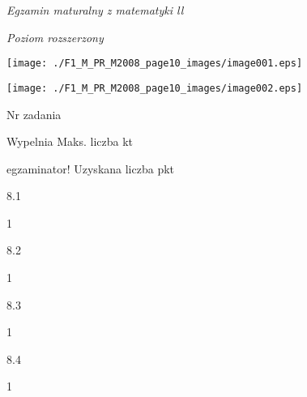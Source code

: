 \documentclass[a4paper,12pt]{article}
\begin{document}
{\it Egzamin maturalny z matematyki ll}

{\it Poziom rozszerzony}
\begin{center}
\texttt{[image: ./F1\_M\_PR\_M2008\_page10\_images/image001.eps]}

\texttt{[image: ./F1\_M\_PR\_M2008\_page10\_images/image002.eps]}
\end{center}
Nr zadania

Wypelnia Maks. liczba kt

egzaminator! Uzyskana liczba pkt

8.1

1

8.2

1

8.3

1

8.4

1
\end{document}
